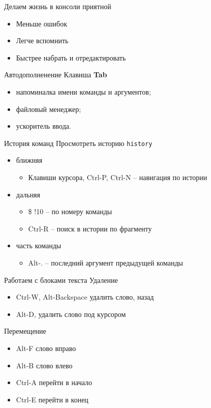 \begin{frame}{Делаем жизнь в консоли приятной}
  \begin{itemize}
	\item Меньше ошибок
	\item Легче вспомнить 
	\item Быстрее набрать и отредактировать
  \end{itemize}
\end{frame}

\begin{frame}{Автодополненение}
  Клавиша \textbf{Tab} 
  \begin{itemize}
	\item напоминалка имени команды и аргументов;
	\item файловый менеджер;
	\item ускоритель ввода.
  \end{itemize}
\end{frame}

\begin{frame}{История команд}
  Просмотреть историю \alert{{\tt history}}
  \begin{itemize}
	\item ближняя
	      \begin{itemize}
		\item Клавиши курсора, \alert{Ctrl-P}, \alert{Ctrl-N} -- навигация по истории
	      \end{itemize}
	\item дальняя 
	      \begin{itemize}
		\item \alert{\$ !10}  -- по номеру команды
		\item \alert{Ctrl-R} -- поиск в истории по фрагменту
	      \end{itemize}
	\item часть команды 
	      \begin{itemize}
		\item \alert{Alt-.}  -- последний аргумент предыдущей команды
	      \end{itemize}
  \end{itemize}
\end{frame}

\begin{frame}{Работаем с блоками текста}
    Удаление
      \begin{itemize}
        \item \alert{Ctrl-W}, \alert{Alt-Backspace} удалить слово, назад
        \item \alert{Alt-D}, удалить слово под курсором 
      \end{itemize}
    Перемещение
      \begin{itemize}
        \item \alert{Alt-F} слово вправо
        \item \alert{Alt-B} слово влево
        \item \alert{Ctrl-A} перейти в начало 
        \item \alert{Ctrl-E} перейти в конец
      \end{itemize}
\end{frame}

